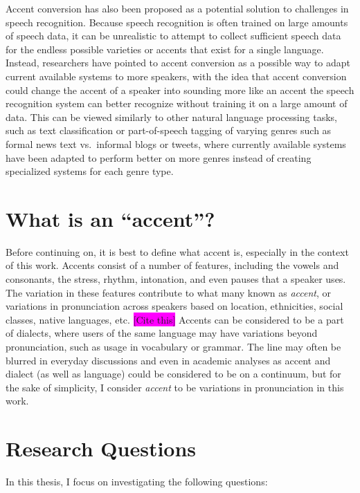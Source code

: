 \documentclass
[
    a4paper,
    twoside,
    12pt,
]
{report}
\begin{document}
Accent conversion has also been proposed as a potential solution to
challenges in speech recognition. Because speech recognition is often
trained on large amounts of speech data, it can be unrealistic to
attempt to collect sufficient speech data for the endless possible
varieties or accents that exist for a single language. Instead,
researchers have pointed to accent conversion as a possible way to adapt
current available systems to more speakers, with the idea that accent
conversion could change the accent of a speaker into sounding more like
an accent the speech recognition system can better recognize without
training it on a large amount of data. This can be viewed similarly to
other natural language processing tasks, such as text classification or
part-of-speech tagging of varying genres such as formal news text
vs.~informal blogs or tweets, where currently available systems have
been adapted to perform better on more genres instead of creating
specialized systems for each genre type.

\hypertarget{what-is-an-accent}{%
\section{What is an ``accent''?}\label{what-is-an-accent}}

Before continuing on, it is best to define what accent is, especially in
the context of this work. Accents consist of a number of features,
including the vowels and consonants, the stress, rhythm, intonation, and
even pauses that a speaker uses. The variation in these features
contribute to what many known as \emph{accent}, or variations in
pronunciation across speakers based on location, ethnicities, social
classes, native languages, etc. \colorbox{magenta}{[Cite this]} Accents
can be considered to be a part of dialects, where users of the same
language may have variations beyond pronunciation, such as usage in
vocabulary or grammar. The line may often be blurred in everyday
discussions and even in academic analyses as accent and dialect (as well
as language) could be considered to be on a continuum, but for the sake
of simplicity, I consider \emph{accent} to be variations in
pronunciation in this work.

\hypertarget{research-questions}{%
\section{Research Questions}\label{research-questions}}

In this thesis, I focus on investigating the following questions:
\end{document}
